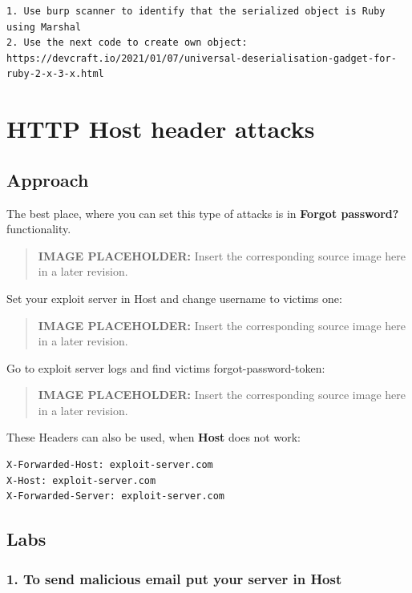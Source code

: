\documentclass[
  letterpaper,
]{article}
\begin{document}
\begin{Verbatim}[breaklines,breakanywhere,fontsize=\small]
1. Use burp scanner to identify that the serialized object is Ruby using Marshal
2. Use the next code to create own object: 
https://devcraft.io/2021/01/07/universal-deserialisation-gadget-for-ruby-2-x-3-x.html 
\end{Verbatim}

\section{HTTP Host header attacks}\label{http-host-header-attacks}

\subsection{Approach}\label{approach-17}

The best place, where you can set this type of attacks is in
\textbf{Forgot password?} functionality.\\
\begin{quote}
\textbf{IMAGE PLACEHOLDER:} Insert the corresponding source image here in a later revision.
\end{quote}
Set your exploit server in Host and change username to
victim\textquotesingle s one:\\
\begin{quote}
\textbf{IMAGE PLACEHOLDER:} Insert the corresponding source image here in a later revision.
\end{quote}
Go to exploit server logs and find victim\textquotesingle s
forgot-password-token:\\
\begin{quote}
\textbf{IMAGE PLACEHOLDER:} Insert the corresponding source image here in a later revision.
\end{quote}
These Headers can also be used, when \textbf{Host} does not work:

\begin{Verbatim}[breaklines,breakanywhere,fontsize=\small]
X-Forwarded-Host: exploit-server.com
X-Host: exploit-server.com
X-Forwarded-Server: exploit-server.com
\end{Verbatim}

\subsection{Labs}\label{labs-16}

\subsubsection{1. To send malicious email put your server in
Host}\label{1-to-send-malicious-email-put-your-server-in-host}
\end{document}
